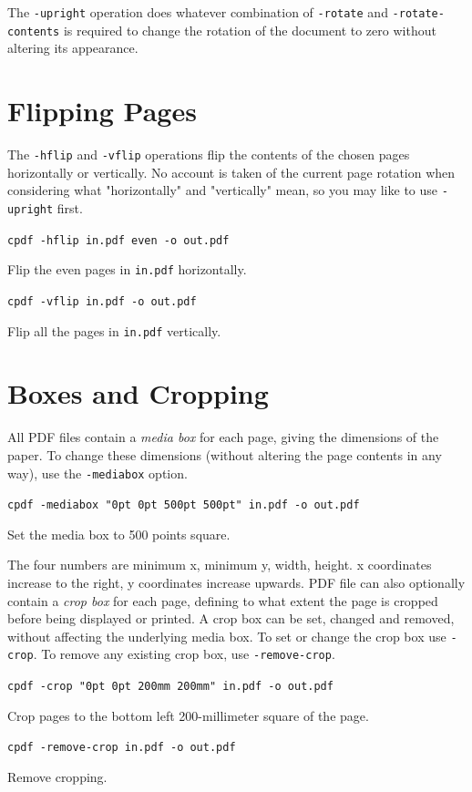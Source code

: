 \documentclass[a4paper,makeidx]{memoir}
\begin{document}
  \label{upright}
   \noindent The \texttt{-upright} operation does whatever combination of
\texttt{-rotate} and \texttt{-rotate-contents} is required to change the
rotation of the document to zero without altering its appearance.

  \section{Flipping Pages}
  The \texttt{-hflip} and \texttt{-vflip} operations flip the contents of the
chosen pages horizontally or vertically. No account is taken of the current
page rotation when considering what "horizontally" and "vertically" mean, so you may like to use \texttt{-upright} first.
  \begin{framed}
    \small\verb!cpdf -hflip in.pdf even -o out.pdf!

    \vspace{2.5mm}
    \noindent Flip the even pages in \texttt{in.pdf} horizontally.

    \vspace{2.5mm}
    \verb!cpdf -vflip in.pdf -o out.pdf!

    \vspace{2.5mm}
    \noindent Flip all the pages in \texttt{in.pdf} vertically.
  \end{framed}

  \section{Boxes and Cropping}
  All PDF files contain a \textit{media box} for each page, giving the
dimensions of the paper. To change these dimensions (without altering the page
contents in any way), use the \texttt{-mediabox} option.
  \begin{framed}
  \small\verb!cpdf -mediabox "0pt 0pt 500pt 500pt" in.pdf -o out.pdf!

  \vspace{2.5mm}
  \noindent Set the media box to 500 points square.
  \end{framed}
  \noindent The four numbers are minimum x, minimum y, width, height. x
coordinates increase to the right, y coordinates increase upwards.
  PDF file can also optionally contain a \textit{crop box} for each page,
defining to what extent the page is cropped before being displayed or printed.
A crop box can be set, changed and removed, without affecting the underlying
media box. To set or change the crop box use \texttt{-crop}. To remove any
existing crop box, use \texttt{-remove-crop}.
  \begin{framed}
  \small\verb!cpdf -crop "0pt 0pt 200mm 200mm" in.pdf -o out.pdf!

  \vspace{2.5mm}
  \noindent Crop pages to the bottom left 200-millimeter square of the page.

  \vspace{2.5mm}
  \verb!cpdf -remove-crop in.pdf -o out.pdf!
  
  \vspace{2.5mm}
  \noindent Remove cropping.
  \end{framed}
\end{document}
